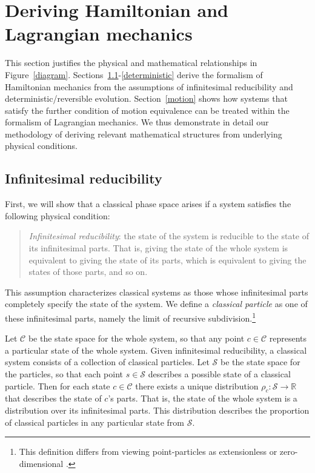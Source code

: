 \documentclass[12pt, english, twoside]{article} %
\newcommand\bs{\begin{singlespace}}
\newcommand\es{\end{singlespace}}
\begin{document}
\section{Deriving Hamiltonian and Lagrangian mechanics}
\label{derivation}

This section justifies the physical and mathematical relationships in Figure~\ref{diagram}.
Sections~\ref{infinitesimal}-\ref{deterministic} derive the formalism of Hamiltonian mechanics from the assumptions of infinitesimal reducibility and deterministic/reversible evolution. Section~\ref{motion} shows how systems that satisfy the further condition of motion equivalence can be treated within the formalism of Lagrangian mechanics. We thus demonstrate in detail our methodology of deriving  relevant mathematical structures from underlying physical conditions.

\subsection{Infinitesimal reducibility}
\label{infinitesimal}

First, we will show that a classical phase space arises if a system satisfies the following physical condition:


\begin{quotation}
\bs \noindent
\textit{Infinitesimal reducibility}: the state of the system is reducible to the state of its infinitesimal parts. That is, giving the state of the whole system is equivalent to giving the state of its parts, which is equivalent to giving the states of those parts, and so on. \es
\end{quotation}


\noindent
This assumption characterizes classical systems as those whose infinitesimal parts completely specify the state of the system. We define a \textit{classical particle} as one of these infinitesimal parts, namely the limit of recursive subdivision.\footnote{This definition differs from viewing point-particles as extensionless \parencites[]{Butterfieldpoints} or zero-dimensional \parencites[]{Wilson}.}

Let $\mathcal{C}$ be the state space for the whole system, so that any point $c \in \mathcal{C}$ represents a particular state of the whole system. Given infinitesimal reducibility, a classical system consists of a collection of classical particles. Let $\mathcal{S}$ be the state space for the particles, so that each point $s \in \mathcal{S}$ describes a possible state of a classical particle. Then for each state $c \in \mathcal{C}$ there exists a unique distribution $\rho_c : \mathcal{S} \to \mathbb{R} $ that describes the state of $c$'s parts. That is, the state of the whole system is a distribution over its infinitesimal parts. This distribution describes the proportion of classical particles in any particular state from $\mathcal{S}$.
\end{document}
